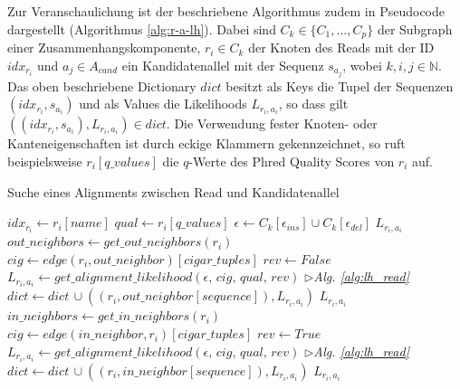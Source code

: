 Zur Veranschaulichung ist der beschriebene Algorithmus zudem in Pseudocode dargestellt (Algorithmus \ref{alg:r-a-lh}). Dabei sind $ C_{k} \in \{C_{1}, \dots ,C_{p}\} $ der Subgraph einer Zusammenhangskomponente, $ r_{i} \in C_{k} $ der Knoten des Reads mit der ID $ idx_{r_{i}}$ und $ a_{j} \in A_{cand} $ ein Kandidatenallel mit der Sequenz $ s_{a_{j}} $, wobei $ k,i,j \in \mathds{N} $. Das oben beschriebene Dictionary $dict$ besitzt als Keys die Tupel der Sequenzen $(idx_{r_{i}}, s_{a_{i}}) $ und als Values die Likelihoods $L_{r_{i}, a_{i}}$, so dass gilt $ ((idx_{r_{i}}, s_{a_{i}}), L_{r_{i}, a_{i}})  \in dict $. Die Verwendung fester Knoten- oder Kanteneigenschaften ist durch eckige Klammern gekennzeichnet, so ruft beispielsweise $r_{i}[q\_values]$ die $ q $-Werte des Phred Quality Scores von $r_{i}$ auf.

\renewcommand{\algorithmiccomment}[1]{\hfill$\triangleright$\textit{#1}}
\begin{algorithm}[H]
	\caption{Suche eines Alignments zwischen Read und Kandidatenallel} \label{alg:r-a-lh}
	\begin{algorithmic}[1]	
		\State $ idx_{r_{i}} \gets r_{i}[name]$
		\State $ qual \gets r_{i}[q\_values] $
		\State $ \epsilon \gets C_{k}[\epsilon_{ins}] \cup C_{k}[\epsilon_{del}] $
		\State \Return $ L_{r_{i}, a_{i}} $
		\EndIf		
		\State $ out\_neighbors \gets get\_out\_neighbors(r_{i})$
		\State $ cig \gets edge(r_{i}, out\_neighbor)[cigar\_tuples]$		
		\State $ rev \gets False $
		\State $ L_{r_{i}, a_{i}} \gets get\_alignment\_likelihood(\epsilon,\, cig,\, qual,\, rev)$
		\algorithmiccomment{Alg. \ref{alg:lh_read}}
		\State $ dict \gets dict \, \cup ((r_{i}, out\_neighbor[sequence]), L_{r_{i}, a_{i}})  $
		\State \Return $L_{r_{i}, a_{i}}$   
		\EndIf
		\EndFor		
		\State $ in\_neighbors \gets get\_in\_neighbors(r_{i})$		
		\State $ cig \gets edge(in\_neighbor, r_{i})[cigar\_tuples]$		
		\State $ rev \gets True $
		\State $ L_{r_{i}, a_{i}} \gets get\_alignment\_likelihood(\epsilon,\, cig,\, qual,\, rev)$
		\algorithmiccomment{Alg. \ref{alg:lh_read}}
		\State $ dict \gets dict \, \cup ((r_{i}, in\_neighbor[sequence]), L_{r_{i}, a_{i}})  $
		\State \Return $L_{r_{i}, a_{i}}$  
		\EndIf		
		\EndFor		
		\State {}
		\EndFunction
	\end{algorithmic}
\end{algorithm}


